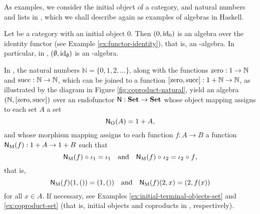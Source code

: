 As examples, we consider the initial object of a category, and natural
numbers and lists in \set, which we shall describe again as examples
of algebras in Haskell.

\begin{example}
  \label{ex:algebra-initial-object}


  Let  be a category with an initial object $0$. Then
  $(0,\operatorname{id}_{0})$ is an algebra over the identity functor (see Example
  \ref{ex:functor-identity}), that is, an -algebra. In
  particular, in \set, $(\emptyset,\operatorname{id}_{\emptyset})$ is an
  -algebra.

\end{example}

\begin{example}
  \label{ex:algebra-natural}


  In \set, the natural numbers $\mathbb{N} = \{0,1,2,...\}$, along
  with the functions $\operatorname{zero}: 1 \to \mathbb{N}$ and $\operatorname{succ}: \mathbb{N}
  \to \mathbb{N}$, which can be joined to a function $[\operatorname{zero},\operatorname{succ}]: 1
  + \mathbb{N} \to \mathbb{N}$, as illustrated by the diagram in
  Figure \ref{fig:coproduct-natural}, yield an algebra
  $(\mathbb{N},[\operatorname{zero},\operatorname{succ}])$ over an endofunctor $\mathsf{N}: \mathbf{Set} \to
  \mathbf{Set}$ whose object mapping assigns to each set $A$ a set
  \begin{equation*}
    \mathsf{N}_{\operatorname{O}}(A) = 1 + A
    \text{,}
  \end{equation*}
  and whose morphism mapping assigns to each function $f: A \to B$ a
  function $\mathsf{N}_{\operatorname{M}}(f): 1 + A \to 1 + B$ such that
  \begin{equation*}
    \mathsf{N}_{\operatorname{M}}(f) \mathrel{\circ} \iota_{1} = \iota_{1}
    \quad
    \text{and}
    \quad
    \mathsf{N}_{\operatorname{M}}(f) \mathrel{\circ} \iota_{2} = \iota_{2} \mathrel{\circ} f
    \text{,}
  \end{equation*}
  that is,
  \begin{equation*}
    \mathsf{N}_{\operatorname{M}}(f)(1,()) = (1,())
    \quad
    \text{and}
    \quad
    \mathsf{N}_{\operatorname{M}}(f)(2,x) = (2,f(x))
  \end{equation*}
  for all $x \in A$. If necessary, see Examples
  \ref{ex:initial-terminal-objects-set} and \ref{ex:coproduct-set}
  (that is, initial objects and coproducts in \set, respectively).

  \begin{figure}[htb]
    \begin{center}
\end{center}
\end{figure}
\end{example}
